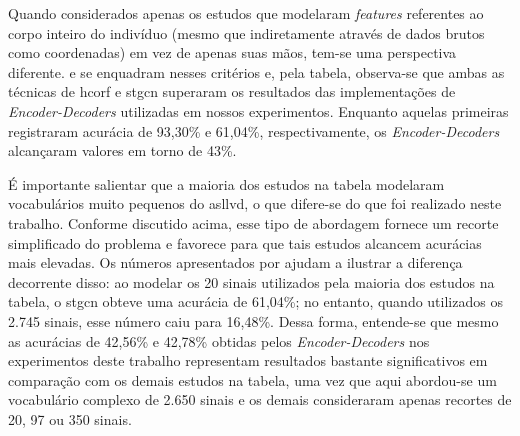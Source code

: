 


Quando considerados apenas os estudos que modelaram \textit{features} referentes ao corpo inteiro do indivíduo (mesmo que indiretamente através de dados brutos como coordenadas) em vez de apenas suas mãos, tem-se uma perspectiva diferente.  e  se enquadram nesses critérios e, pela tabela, observa-se que ambas as técnicas de \acrshort{hcorf} e \acrshort{stgcn} superaram os resultados das implementações de \textit{Encoder-Decoders} utilizadas em nossos experimentos. Enquanto aquelas primeiras registraram acurácia de 93,30\% e 61,04\%, respectivamente, os \textit{Encoder-Decoders} alcançaram valores em torno de 43\%.

É importante salientar que a maioria dos estudos na tabela modelaram vocabulários muito pequenos do \acrshort{asllvd}, o que difere-se do que foi realizado neste trabalho. Conforme discutido acima, esse tipo de abordagem fornece um recorte simplificado do problema e favorece para que tais estudos alcancem acurácias mais elevadas.
Os números apresentados por  ajudam a ilustrar a diferença decorrente disso: ao modelar os 20 sinais utilizados pela maioria dos estudos na tabela, o \acrshort{stgcn} obteve uma acurácia de 61,04\%; no entanto, quando utilizados os 2.745 sinais, esse número caiu para 16,48\%.
Dessa forma, entende-se que mesmo as acurácias de 42,56\% e 42,78\% obtidas pelos \textit{Encoder-Decoders} nos experimentos deste trabalho representam resultados bastante significativos em comparação com os demais estudos na tabela, uma vez que aqui abordou-se um vocabulário complexo de 2.650 sinais e os demais consideraram apenas recortes de 20, 97 ou 350 sinais.
